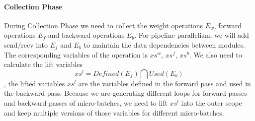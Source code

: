 \documentclass[sigplan, nonacm]{acmart}\settopmatter{printfolios=true,printccs=false,printacmref=false}
\begin{document}
\paragraph{Collection Phase}
During Collection Phase we need to collect the weight operations $E_w$, forward operations $E_f$ and backward operations $E_b$. For pipeline parallelism, we will add send/recv into $E_f$ and $E_b$ to maintain the data dependencies between modules. The corresponding variables of the operation is $xs^w$, $xs^f$, $xs^b$. We also need to calculate the lift variables $$xs^l = Defined(E_f) \bigcap Used(E_b)$$, the lifted variables $xs^l$ are the variables defined in the forward pass and used in the backward pass. Because we are generating different loops for forward passes and backward passes of micro-batches, we need to lift $xs^l$ into the outer scope and keep multiple versions of those variables for different micro-batches.\par
\end{document}
